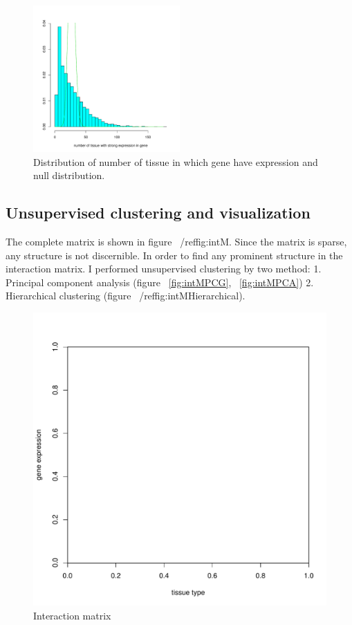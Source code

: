 \documentclass{article}
\begin{document}
\begin{figure}[ht]
	\begin{center}
		\includegraphics[width=0.5\textwidth]{weakExpressed.pdf}
	\end{center}
	\caption{ Distribution of number of tissue in which gene have expression and null distribution.}
	\label{fig:weakEx}
\end{figure}


\subsection{Unsupervised clustering and visualization}

The complete matrix is shown in 
figure ~/ref{fig:intM}. Since the matrix is sparse, any structure is not discernible. 
In order to find any prominent structure in the interaction matrix. I performed unsupervised clustering by two method: 1. Principal component
analysis (figure ~\ref{fig:intMPCG}, ~\ref{fig:intMPCA}) 2. Hierarchical clustering (figure ~/ref{fig:intMHierarchical}).

\begin{figure}[ht]
	\begin{center}
		\includegraphics[scale=0.5]{interactionMatrix.pdf}
	\end{center}
	\caption{Interaction matrix}
	\label{fig:intM}
\end{figure}
\end{document}
